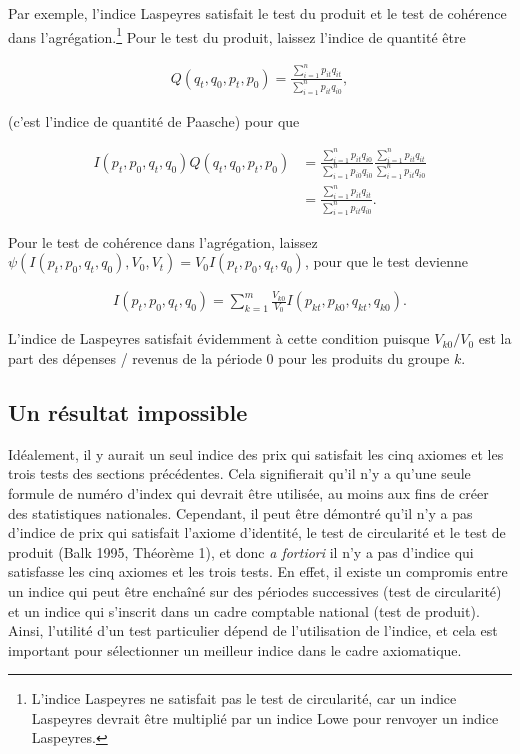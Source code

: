 \documentclass[
]{article}
\begin{document}
Par exemple, l'indice Laspeyres satisfait le test du produit et le test de cohérence dans l'agrégation.\footnote{L'indice Laspeyres ne satisfait pas le test de circularité, car un indice Laspeyres devrait être multiplié par un indice Lowe pour renvoyer un indice Laspeyres.} Pour le test du produit, laissez l'indice de quantité être

\begin{align*}
Q (q_{t}, q_{0}, p_{t}, p_{0}) = \frac{\sum_{i = 1}^{n} p_{it} q_{it}}{\sum_{i = 1}^{n} p_{it} q_{i0}},
\end{align*}

(c'est l'indice de quantité de Paasche) pour que

\begin{align*}
I(p_{t}, p_{0}, q_{t}, q_{0}) Q (q_{t}, q_{0}, p_{t}, p_{0}) &= \frac{\sum_{i = 1}^{n} p_{it} q_{i0}}{\sum_{i = 1}^{n} p_{i0} q_{i0}} \frac{\sum_{i = 1}^{n} p_{it} q_{it}}{\sum_{i = 1}^{n} p_{it} q_{i0}} \\
&= \frac{\sum_{i = 1}^{n} p_{it} q_{it}}{\sum_{i = 1}^{n} p_{it} q_{i0}}.
\end{align*}

Pour le test de cohérence dans l'agrégation, laissez \(\psi (I(p_{t}, p_{0}, q_{t}, q_{0}), V_{0}, V_{t}) = V_0 I(p_{t}, p_{0}, q_{t}, q_{0})\), pour que le test devienne

\begin{align*}
I(p_{t}, p_{0}, q_{t}, q_{0}) = \sum_{k = 1}^{m} \frac{V_{k0}}{V_0} I(p_{kt }, p_{k0}, q_{kt}, q_{k0}).
\end{align*}

L'indice de Laspeyres satisfait évidemment à cette condition puisque \(V_{k0} / V_0\) est la part des dépenses / revenus de la période 0 pour les produits du groupe \(k\).

\hypertarget{un-ruxe9sultat-impossible}{%
\subsection{Un résultat impossible}\label{un-ruxe9sultat-impossible}}

Idéalement, il y aurait un seul indice des prix qui satisfait les cinq axiomes et les trois tests des sections précédentes. Cela signifierait qu'il n'y a qu'une seule formule de numéro d'index qui devrait être utilisée, au moins aux fins de créer des statistiques nationales. Cependant, il peut être démontré qu'il n'y a pas d'indice de prix qui satisfait l'axiome d'identité, le test de circularité et le test de produit (Balk 1995, Théorème 1), et donc \emph{a fortiori} il n'y a pas d'indice qui satisfasse les cinq axiomes et les trois tests. En effet, il existe un compromis entre un indice qui peut être enchaîné sur des périodes successives (test de circularité) et un indice qui s'inscrit dans un cadre comptable national (test de produit). Ainsi, l'utilité d'un test particulier dépend de l'utilisation de l'indice, et cela est important pour sélectionner un meilleur indice dans le cadre axiomatique.
\end{document}
